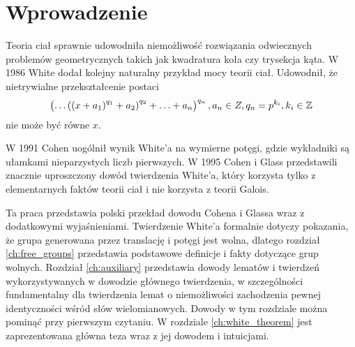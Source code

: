 \chapter{Wprowadzenie}

Teoria ciał sprawnie udowodniła niemożliwość rozwiązania odwiecznych problemów
geometrycznych takich jak kwadratura koła czy trysekcja kąta. W 1986 White
\cite{whi88} dodał kolejny naturalny przykład mocy teorii ciał. Udowodnił, że
nietrywialne przekształcenie postaci
\[
  \left( \ldots \left(\left(x + a_1\right)^{q_1} + a_2\right)^{q_2} +
    \ldots + a_n\right)^{q_n}, a_n \in Z, q_n = p^{k_i}, k_i \in \mathbb{Z}
\]
nie może być równe $x$.

W 1991 Cohen \cite{coh91} uogólnił wynik White'a na wymierne potęgi, gdzie
wykładniki są ułamkami nieparzystych liczb pierwszych. W 1995 Cohen i Glass
\cite{coh95} przedstawili znacznie uproszczony dowód twierdzenia White'a, który
korzysta tylko z elementarnych faktów teorii ciał i nie korzysta z teorii
Galois.

Ta praca przedstawia polski przekład dowodu Cohena i Glassa wraz z dodatkowymi
wyjaśnieniami. Twierdzenie White'a formalnie dotyczy pokazania, że grupa
generowana przez translację i potęgi jest wolna, dlatego rozdział
\ref{ch:free_groups} przedstawia podstawowe definicje i fakty dotyczące grup
wolnych. Rozdział \ref{ch:auxiliary} przedstawia dowody lematów i twierdzeń
wykorzystywanych w dowodzie głównego twierdzenia, w szczególności fundamentalny
dla twierdzenia lemat o niemożliwości zachodzenia pewnej identyczności wśród
słów wielomianowych. Dowody w tym rozdziale można pominąć przy pierwszym
czytaniu. W rozdziale \ref{ch:white_theorem} jest zaprezentowana główna teza
wraz z jej dowodem i intuicjami.
